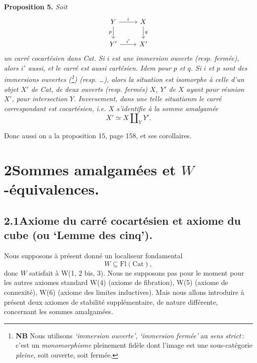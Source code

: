 \documentclass[11pt]{article}
\newcommand{\printedpage}[1]{\marginpar{\footnotesize p.~#1}}
\begin{document}
\textbf{Proposition 5.} \textit{Soit}
\[
\begin{tikzcd}
Y \arrow[r, "i"] \arrow[d, "p"'] & X \arrow[d, "q"] \\
Y' \arrow[r, "i'"] & X'
\end{tikzcd}
\]
\printedpage{54}
\textit{un carré cocartésien dans \textup{Cat}. Si $i$ est une immersion ouverte (resp. fermée), alors $i'$ aussi, et le carré est aussi cartésien. Idem pour $p$ et $q$. Si $i$ et $p$ sont des immersions ouvertes (\footnote{\textbf{NB} Nous utilisons \textit{`immersion ouverte'}, \textit{`immersion fermée'} au \textit{sens strict}\,: c'est un \textit{monomorphisme} pleinement fidèle dont l'image est une sous-catégorie \textit{pleine,} soit ouverte, soit fermée.}) (resp. \dots), alors la situation est isomorphe à celle d'un objet $X'$ de \textup{Cat}, de deux ouverts (resp. fermés) $X$, $Y'$ de $X$ ayant pour réunion $X'$, pour intersection} %
\textit{$Y$. Inversement, dans une telle situationm le carré correspondant est cocartésien, i.e. $X$} %
 \textit{s'identifie à la somme amalgamée}
\[
X'\simeq X\amalg_{Y}Y'.
\]

Donc aussi on a la proposition 15, page 158, et ses corollaires.

\printedpage{55}

\section*{2\quad Sommes amalgamées et $W$-équivalences.}

\subsection*{2.1\quad Axiome du carré cocartésien et axiome du cube (ou `Lemme des cinq').}

Nous supposons à présent donné un localiseur fondamental
\[
W\subseteq\mathrm{Fl}(\mathrm{Cat}),
\]
donc $W$ satisfait à W(1, 2 bis, 3). Nous ne supposons pas pour le moment pour les autres axiomes standard W(4) (axiome de fibration), W(5) (axiome de connexité), W(6) (axiome des limites inductives). Mais nous allons introduire à présent deux axiomes de stabilité supplémentaire, de nature différente, concernant les sommes amalgamées.
\end{document}
